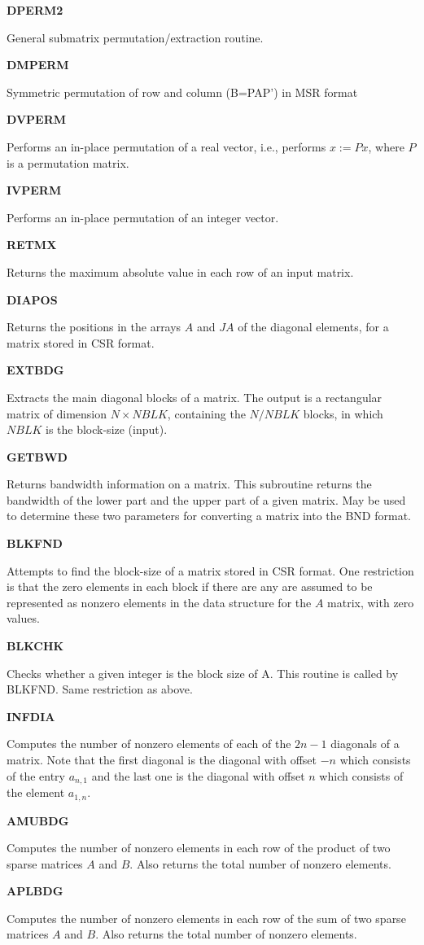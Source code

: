 \documentclass[12pt]{article}
\def\marg#1{\parbox[b]{1.3in}{\bf #1}}
\def\disp#1{\parbox[t]{4.62in}{#1} \vskip 0.2in }
\begin{document}
\marg{DPERM2}\disp{General submatrix permutation/extraction routine.}

\marg{DMPERM}\disp{Symmetric permutation of row and column (B=PAP') in MSR format}

\marg{DVPERM}\disp{ Performs an in-place permutation of a real vector, i.e.,
performs $x := P x $, where $P$ is a permutation matrix. }

\marg{IVPERM}\disp{ Performs an in-place permutation of an
integer vector.} 

\marg{RETMX}\disp{ Returns the maximum absolute value in each row  
of an input matrix.  } 

\marg{DIAPOS}\disp{ Returns the positions in the arrays $A$ and 
$ JA$ of the  diagonal elements, for a matrix stored in CSR format. } 

\marg{ EXTBDG  }\disp{ Extracts the main diagonal blocks of a matrix. 
The output is a rectangular matrix of dimension $N \times NBLK$,
containing the $N/NBLK$ blocks, 
in which $NBLK$ is the block-size (input).}

\marg{ GETBWD  }\disp{ Returns bandwidth information on a matrix. This
subroutine returns the bandwidth of the lower part and the upper part
of a given matrix. May be used to determine these two parameters
for converting a matrix into the BND format.}

\marg{ BLKFND  }\disp{ Attempts to find the block-size of a matrix
stored in CSR format. One restriction is that the zero elements in 
each block if there are any are assumed to be represented as nonzero 
elements in the data structure for the $A$ matrix, with zero values. }

\marg{ BLKCHK  }\disp{ Checks whether a given integer is the block 
size of A.  This routine is called by BLKFND. Same restriction as
above.} 

\marg{ INFDIA  }\disp{ Computes the number of nonzero elements 
of each of the $2n-1$ diagonals of a matrix. Note that the first diagonal 
is the diagonal with offset $-n$ which consists of the entry
$a_{n,1}$ and the last one is the diagonal with offset $n$ which consists
of the element $a_{1,n}$.}

\marg{ AMUBDG }\disp{ Computes the number of nonzero elements
in each row of the product of two sparse matrices $A$ and $B$.
Also returns the total number of nonzero elements.}

\marg{ APLBDG }\disp{ Computes the number of nonzero elements
in each row of the sum of two sparse matrices $A$ and $B$.
Also returns the total number of nonzero elements.}
\end{document}
